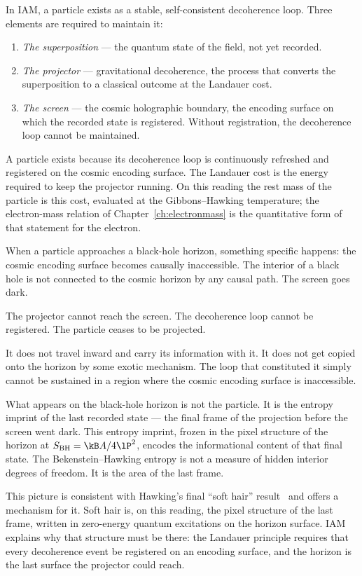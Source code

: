 In IAM, a particle exists as a stable, self-consistent decoherence loop. Three elements are required to maintain it:
\begin{enumerate}
\item \emph{The superposition} --- the quantum state of the field, not yet recorded.
\item \emph{The projector} --- gravitational decoherence, the process that converts the superposition to a classical outcome at the Landauer cost.
\item \emph{The screen} --- the cosmic holographic boundary, the encoding surface on which the recorded state is registered. Without registration, the
decoherence loop cannot be maintained.
\end{enumerate}
A particle exists because its decoherence loop is continuously refreshed and registered on the cosmic encoding surface. The Landauer cost is the energy
required to keep the projector running. On this reading the rest mass of the particle is this cost, evaluated at the Gibbons--Hawking temperature; the
electron-mass relation of Chapter~\ref{ch:electronmass} is the quantitative form of that statement for the electron. \conjecture

When a particle approaches a black-hole horizon, something specific happens: the cosmic encoding surface becomes causally inaccessible. The interior of a
black hole is not connected to the cosmic horizon by any causal path. The screen goes dark.

The projector cannot reach the screen. The decoherence loop cannot be registered. The particle ceases to be projected.

It does not travel inward and carry its information with it. It does not get copied onto the horizon by some exotic mechanism. The loop that constituted
it simply cannot be sustained in a region where the cosmic encoding surface is inaccessible.

What appears on the black-hole horizon is not the particle. It is the entropy imprint of the last recorded state --- the final frame of the projection before
the screen went dark. This entropy imprint, frozen in the pixel structure of the horizon at $S_{\rm BH}=\kB A/4\lP^2$, encodes the informational content of that
final state. The Bekenstein--Hawking entropy is not a measure of hidden interior degrees of freedom. It is the area of the last frame. \conjecture

This picture is consistent with Hawking's final ``soft hair'' result~\cite{HawkingPerryStrominger2016} and offers a mechanism for it. Soft hair is, on this reading, the pixel
structure of the last frame, written in zero-energy quantum excitations on the horizon surface. IAM explains why that structure must be there: the Landauer
principle requires that every decoherence event be registered on an encoding surface, and the horizon is the last surface the projector could reach.
\conjecture

